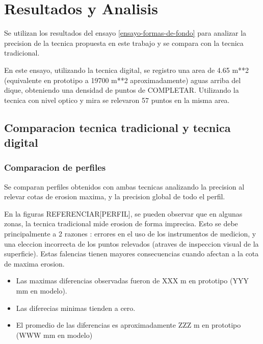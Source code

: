 \chapter{Resultados y Analisis}

Se utilizan los resultados del ensayo \ref{ensayo-formas-de-fondo} para analizar la precision de la tecnica propuesta en este trabajo y se compara con la tecnica tradicional.

En este ensayo, utilizando la tecnica digital, se registro una area de 4.65 m**2 (equivalente en prototipo a 19700 m**2 aproximadamente) aguas arriba del dique, obteniendo una densidad de puntos de COMPLETAR. Utilizando la tecnica con nivel optico y mira se relevaron 57 puntos en la misma area.

\section{Comparacion tecnica tradicional y tecnica digital}

\subsection{Comparacion de perfiles}
Se comparan perfiles obtenidos con ambas tecnicas analizando la precision al relevar cotas de erosion maxima, y la precision global de todo el perfil.

En la figuras REFERENCIAR[PERFIL], se pueden observar que en algunas zonas, la tecnica tradicional mide erosion de forma imprecisa. Esto se debe principalmente a 2 razones : errores en el uso de los instrumentos de medicion, y una eleccion incorrecta de los puntos relevados (atraves de inspeccion visual de la superficie). Estas falencias tienen mayores consecuencias cuando afectan a la cota de maxima erosion.

\begin{itemize}
A partir de las diferencias absolutas para los valores de elevacion entre ambas tecnicas, se obtuvo que : 

\item Las maximas diferencias observadas fueron de XXX m en prototipo (YYY mm en modelo). 

\item Las diferecias minimas tienden a cero.

\item El promedio de las diferencias es aproximadamente ZZZ m en prototipo (WWW mm en modelo) \\

\end{itemize}

